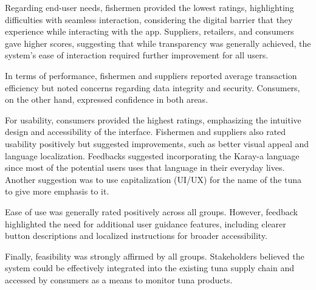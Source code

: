 \noindent Regarding end-user needs, fishermen provided the lowest ratings, highlighting difficulties with seamless interaction, considering the digital barrier that they experience while interacting with the app. Suppliers, retailers, and consumers gave higher scores, suggesting that while transparency was generally achieved, the system's ease of interaction required further improvement for all users.

\noindent In terms of performance, fishermen and suppliers reported average transaction efficiency but noted concerns regarding data integrity and security. Consumers, on the other hand, expressed confidence in both areas.

\noindent For  usability, consumers provided the highest ratings, emphasizing the intuitive design and accessibility of the interface. Fishermen and suppliers also rated usability positively but suggested improvements, such as better visual appeal and language localization. Feedbacks suggested incorporating the Karay-a language since most of the potential users uses that language in their everyday lives. Another suggestion was to use capitalization (UI/UX) for the name of the tuna to give more emphasis to it.  

\noindent Ease of use was generally rated positively across all groups. However, feedback highlighted the need for additional user guidance features, including clearer button descriptions and localized instructions for broader accessibility.

\noindent Finally, feasibility was strongly affirmed by all groups. Stakeholders believed the system could be effectively integrated into the existing tuna supply chain and accessed by consumers as a means to monitor tuna products.



